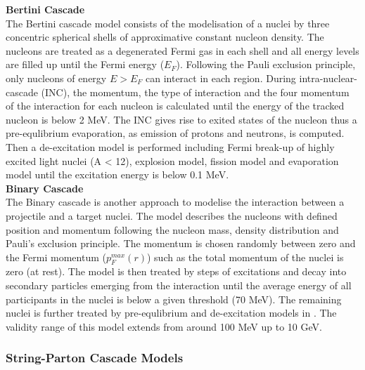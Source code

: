 \textbf{Bertini Cascade}\\

The Bertini cascade model \cite{Heikkinen2003} consists of the modelisation of a nuclei by three concentric spherical shells of approximative constant nucleon density. The nucleons are treated as a degenerated Fermi gas in each shell and all energy levels are filled up until the Fermi energy ($E_F$). Following the Pauli exclusion principle, only nucleons of energy $E > E_F$ can interact in each region. During intra-nuclear-cascade (INC), the momentum, the type of interaction and the four momentum of the interaction for each nucleon is calculated until the energy of the tracked nucleon is below 2 MeV. The INC gives rise to exited states of the nucleon thus a pre-equlibrium evaporation, as emission of protons and neutrons, is computed. Then a de-excitation model is performed including Fermi break-up of highly excited light nuclei (A < 12), explosion model, fission model and evaporation model until the excitation energy is below 0.1 MeV.\\

\textbf{Binary Cascade}\\

The Binary cascade \cite{Folger2004} is another approach to modelise the interaction between a projectile and a target nuclei. The model describes the nucleons with defined position and momentum following the nucleon mass, density distribution and Pauli's exclusion principle. The momentum is chosen randomly between zero and the Fermi momentum ($p_{F}^{max}(r)$) such as the total momentum of the nuclei is zero (at rest). The model is then treated by steps of excitations and decay into secondary particles emerging from the interaction until the average energy of all participants in the nuclei is below a given threshold (70 MeV). The remaining nuclei is further treated by pre-equlibrium and de-excitation models in \geant. The validity range of this model extends from around 100 MeV up to 10 GeV.

\subsubsection{String-Parton Cascade Models}

